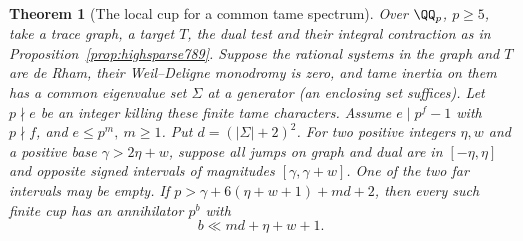 \documentclass[a4paper,11pt]{article}
\newtheorem{theorem}[proposition]{Theorem}
\theoremstyle{definition}
\theoremstyle{remark}
\numberwithin{equation}{section}
\begin{document}
\begin{theorem}[The local cup for a common tame spectrum]
\leavevmode\label{thm:tamecups800}
Over \(\QQ_p\), \(p\ge5\), take a trace graph, a target
\(T\), the dual test and their integral contraction as
in Proposition~\ref{prop:highsparse789}. Suppose the
rational systems in the graph and \(T\) are de Rham,
their Weil--Deligne monodromy is zero, and tame inertia
on them has a common eigenvalue set \(\Sigma\) at a
generator (an enclosing set suffices). Let \(p\nmid e\)
be an integer killing these finite tame characters.
Assume \(e\mid p^f-1\) with \(p\nmid f\), and
\(e\le p^m,\ m\ge1\). Put \(d=(|\Sigma|+2)^2\).
For two positive integers \(\eta,w\) and a positive
base \(\gamma>2\eta+w\), suppose all jumps on graph
and dual are in \([-\eta,\eta]\) and opposite signed
intervals of magnitudes \([\gamma,\gamma+w]\).
One of the two far intervals may be empty.
If \(p>\gamma+6(\eta+w+1)+md+2\), then every such
finite cup has an annihilator \(p^b\) with
\[
                     b\ll md+\eta+w+1 .
\]
\end{theorem}
\end{document}
